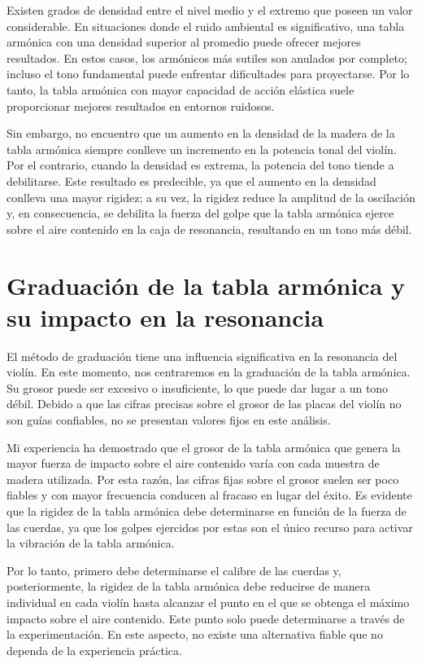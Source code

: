 \documentclass[12pt]{book}
\begin{document}
Existen grados de densidad entre el nivel medio y el extremo que poseen un valor considerable. En situaciones donde el ruido ambiental es significativo, una tabla armónica con una densidad superior al promedio puede ofrecer mejores resultados. En estos casos, los armónicos más sutiles son anulados por completo; incluso el tono fundamental puede enfrentar dificultades para proyectarse. Por lo tanto, la tabla armónica con mayor capacidad de acción elástica suele proporcionar mejores resultados en entornos ruidosos.

Sin embargo, no encuentro que un aumento en la densidad de la madera de la tabla armónica siempre conlleve un incremento en la potencia tonal del violín. Por el contrario, cuando la densidad es extrema, la potencia del tono tiende a debilitarse. Este resultado es predecible, ya que el aumento en la densidad conlleva una mayor rigidez; a su vez, la rigidez reduce la amplitud de la oscilación y, en consecuencia, se debilita la fuerza del golpe que la tabla armónica ejerce sobre el aire contenido en la caja de resonancia, resultando en un tono más débil.

\section*{Graduación de la tabla armónica y su impacto en la resonancia}

El método de graduación tiene una influencia significativa en la resonancia del violín. En este momento, nos centraremos en la graduación de la tabla armónica. Su grosor puede ser excesivo o insuficiente, lo que puede dar lugar a un tono débil. Debido a que las cifras precisas sobre el grosor de las placas del violín no son guías confiables, no se presentan valores fijos en este análisis.  

Mi experiencia ha demostrado que el grosor de la tabla armónica que genera la mayor fuerza de impacto sobre el aire contenido varía con cada muestra de madera utilizada. Por esta razón, las cifras fijas sobre el grosor suelen ser poco fiables y con mayor frecuencia conducen al fracaso en lugar del éxito. Es evidente que la rigidez de la tabla armónica debe determinarse en función de la fuerza de las cuerdas, ya que los golpes ejercidos por estas son el único recurso para activar la vibración de la tabla armónica.  

Por lo tanto, primero debe determinarse el calibre de las cuerdas y, posteriormente, la rigidez de la tabla armónica debe reducirse de manera individual en cada violín hasta alcanzar el punto en el que se obtenga el máximo impacto sobre el aire contenido. Este punto solo puede determinarse a través de la experimentación. En este aspecto, no existe una alternativa fiable que no dependa de la experiencia práctica.
\end{document}
